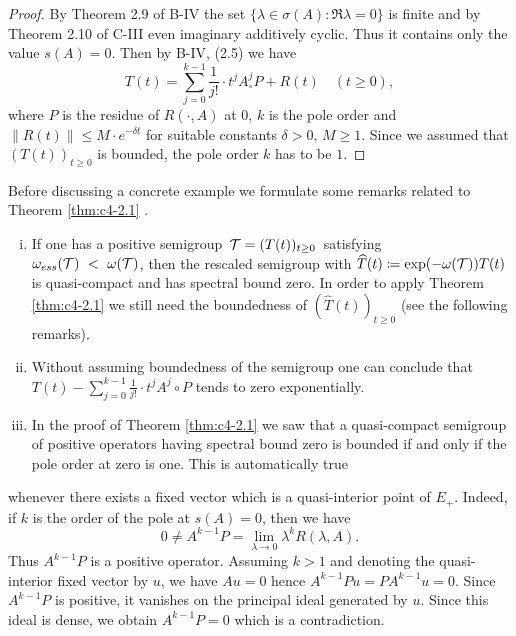 \begin{proof}
By Theorem 2.9 of B-IV the set $\{\lambda \in \sigma(A) \colon \Re  \lambda = 0\}$ is finite and by Theorem 2.10 of C-III even imaginary additively cyclic.
Thus it contains only the value $s(A) = 0$.
Then by B-IV, (2.5) we have
\begin{equation*}\label{eq:c4-2.1-kgk}
T(t) = \sum_{j=0}^{k-1} \frac{1}{j!} \cdot t^{j}A^{j}_{\circ}P + R(t) \quad (t \geq 0),
\end{equation*}
where $P$ is the residue of $R(\cdot,A)$ at $0$, $k$ is the pole order and $\|R(t)\| \leq M \cdot e^{-\delta t}$ for suitable constants $\delta > 0$, $M \geq 1$.
Since we assumed that $(T(t))_{t \geq 0}$ is bounded, the pole order $k$ has to be $1$.
\end{proof}

Before discussing a concrete example we formulate some remarks related to Theorem \ref{thm:c4-2.1} .

\begin{remarks}\label{rem:c4-2.2}
\begin{enumerate}[(i)]
\item \label{rem:c4-2.2-1}
If one has a positive semigroup\, $\mathcal{T} = (T(t))_{t \geq 0}$\,  satisfying\\ $\omega_{ess}(\mathcal{T})~<~\omega(\mathcal{T})$, then the rescaled semigroup with $\widehat{T}(t) \coloneqq \exp(-\omega(\mathcal{T}))T(t)$ is quasi-compact and has spectral bound zero.
In order to apply Theorem \ref{thm:c4-2.1} we still need the boundedness of $(\widehat{T}(t))_{t\geq 0}$ (see the following remarks).
\item \label{rem:c4-2.2-2}
Without assuming boundedness of the semigroup one can conclude that $T(t) - \sum_{j=0}^{k-1} \frac{1}{j!} \cdot t^{j}A^{j}{\circ}P$ tends to zero exponentially.
\item \label{rem:c4-2.2-3}
In the proof of Theorem \ref{thm:c4-2.1} we saw that a quasi-compact semigroup of positive operators having spectral bound zero is bounded if and only if the pole order at zero is one.
This is automatically true
\end{enumerate}
\end{remarks}


whenever there exists a fixed vector which is a quasi-interior point of $E_{+}$.
Indeed, if $k$ is the order of the pole at $s(A) = 0$, then we have 
\[
0 \neq A^{k-1}P = \lim_{\lambda \to 0} \lambda^{k}R(\lambda,A).
\]
Thus $A^{k-1}P$ is a positive operator.
Assuming $k > 1$ and denoting the quasi-interior fixed vector by $u$, we have $Au = 0$ hence $A^{k-1}Pu = PA^{k-1}u = 0$.
Since $A^{k-1}P$ is positive, it vanishes on the principal ideal generated by $u$.
Since this ideal is dense, we obtain $A^{k-1}P = 0$ which is a contradiction.

